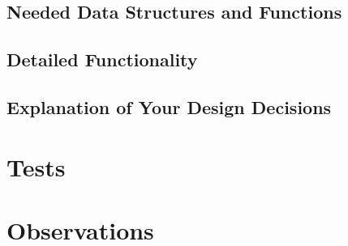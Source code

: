\subsection{Needed Data Structures and Functions}



\subsection{Detailed Functionality}



\subsection{Explanation of Your Design Decisions}


\section{Tests}



\section{Observations}


